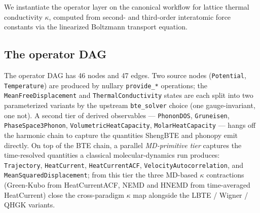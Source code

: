 \documentclass[11pt,a4paper]{article}
\begin{document}
We instantiate the operator layer on the canonical workflow for lattice thermal conductivity $\kappa$,
computed from second- and third-order interatomic force constants via the linearized Boltzmann
transport equation.

\subsection{The operator DAG}

The operator DAG has 46 nodes and 47 edges. Two source nodes (\texttt{Potential},
\texttt{Temperature}) are produced by nullary \texttt{provide\_*} operations; the
\texttt{MeanFreeDisplacement} and \texttt{ThermalConductivity} states are each split
into two parameterized variants by the upstream \texttt{bte\_solver} choice (one
gauge-invariant, one not). A second tier of derived observables ---
\texttt{PhononDOS}, \texttt{Gruneisen}, \texttt{PhaseSpace3Phonon},
\texttt{VolumetricHeatCapacity}, \texttt{MolarHeatCapacity} --- hangs off the
harmonic chain to capture the quantities ShengBTE and phonopy emit directly.
On top of the BTE chain, a parallel \emph{MD-primitive tier} captures the
time-resolved quantities a classical molecular-dynamics run produces:
\texttt{Trajectory}, \texttt{HeatCurrent}, \texttt{HeatCurrentACF},
\texttt{VelocityAutocorrelation}, and \texttt{MeanSquaredDisplacement}; from this
tier the three MD-based $\kappa$ contractions (Green-Kubo from HeatCurrentACF,
NEMD and HNEMD from time-averaged HeatCurrent) close the cross-paradigm
$\kappa$ map alongside the LBTE / Wigner / QHGK variants.
\end{document}
